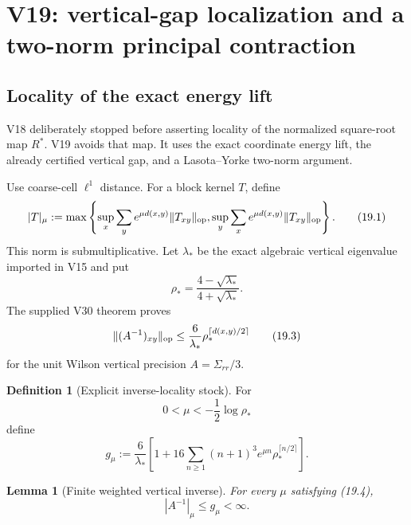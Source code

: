 \documentclass[11pt,oneside]{book}
\newtheorem{lemma}[theorem]{Lemma}
\theoremstyle{definition}
\newtheorem{definition}[theorem]{Definition}
\theoremstyle{remark}
\begin{document}

\section{V19: vertical-gap localization and a two-norm principal
contraction}
\label{sec:e8v19}

\subsection{Locality of the exact energy lift}

V18 deliberately stopped before asserting locality of the normalized
square-root map \(R^*\).  V19 avoids that map.  It uses the exact
coordinate energy lift, the already certified vertical gap, and a
Lasota--Yorke two-norm argument.

Use coarse-cell \(\ell^1\) distance.  For a block kernel \(T\), define
\[
 |T|_\mu:=
 \max\left\{
 \sup_x\sum_y e^{\mu d(x,y)}\|T_{xy}\|_{\rm op},
 \sup_y\sum_x e^{\mu d(x,y)}\|T_{xy}\|_{\rm op}
 \right\}.                                                         \tag{19.1}
\]
This norm is submultiplicative.  Let \(\lambda_*\) be the exact
algebraic vertical eigenvalue imported in V15 and put
\[
 \rho_*=\frac{4-\sqrt{\lambda_*}}{4+\sqrt{\lambda_*}}.             \tag{19.2}
\]
The supplied V30 theorem proves
\[
\|(A^{-1})_{xy}\|_{\rm op}
\leq\frac6{\lambda_*}
       \rho_*^{\lceil d(x,y)/2\rceil}                              \tag{19.3}
\]
for the unit Wilson vertical precision \(A=\Sigma_{rr}/3\).

\begin{definition}[Explicit inverse-locality stock]
\label{def:e8v19-gmu}
For
\[
                         0<\mu<-\frac12\log\rho_*                  \tag{19.4}
\]
define
\[
 g_\mu:=
\frac6{\lambda_*}
\left[
1+16\sum_{n\geq1}(n+1)^3e^{\mu n}
        \rho_*^{\lceil n/2\rceil}
\right].                                                          \tag{19.5}
\]
\end{definition}

\begin{lemma}[Finite weighted vertical inverse]
\label{lem:e8v19-inverse}
For every \(\mu\) satisfying (19.4),
\[
                         |A^{-1}|_\mu\leq g_\mu<\infty.             \tag{19.6}
\]
\end{lemma}
\end{document}
